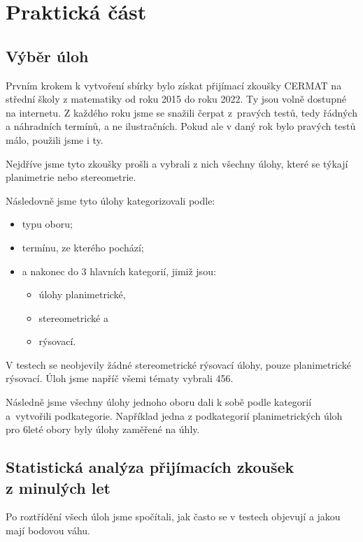 \chapter{Praktická část}


\section{Výběr úloh}

Prvním krokem k vytvoření sbírky bylo získat přijímací zkoušky CERMAT na střední školy z matematiky od roku 2015 do roku 2022. Ty jsou volně dostupné na internetu. Z každého roku jsme se snažili čerpat z~pravých testů, tedy řádných a náhradních termínů, a ne ilustračních. Pokud ale v daný rok bylo pravých testů málo, použili jsme i ty.

Nejdříve jsme tyto zkoušky prošli a vybrali z nich všechny úlohy, které se týkají planimetrie nebo stereometrie.

Následovně jsme tyto úlohy kategorizovali podle:
\begin{itemize}
    \item typu oboru;
    \item termínu, ze kterého pochází;
    \item a nakonec do 3 hlavních kategorií, jimiž jsou:
    \begin{itemize}
        \item úlohy planimetrické,
        \item stereometrické a
        \item rýsovací.
    \end{itemize}
\end{itemize}

V testech se neobjevily žádné stereometrické rýsovací úlohy, pouze planimetrické rýsovací. Úloh jsme napříč všemi tématy vybrali 456.

Následně jsme všechny úlohy jednoho oboru dali k sobě podle kategorií a~vytvořili podkategorie. Například jedna z podkategorií planimetrických úloh pro 6leté obory byly úlohy zaměřené na úhly.


\section[Statistická analýza přijímacích zkoušek z minulých let]{Statistická analýza přijímacích zkoušek\\z minulých let}

Po roztřídění všech úloh jsme spočítali, jak často se v testech objevují a jakou mají bodovou váhu.

